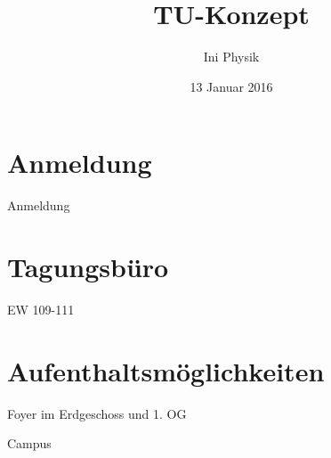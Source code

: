 \documentclass[compress,]{beamer}
\title[TU-Konzept]{TU-Konzept}
\author{Ini Physik}
\institute[TU Berlin]
\begin{document}
\subject{Konzept an der TU}
\date{13 Januar 2016}

\begin{frame}
\titlepage
\end{frame}


\frame{\tableofcontents}

\section{Anmeldung}
\begin{frame}{Anmeldung}
\end{frame}


\section{Tagungsbüro}
\begin{frame}{EW 109-111}
\end{frame}


\section{Aufenthaltsmöglichkeiten}
\begin{frame}{Foyer im Erdgeschoss und 1. OG}
\end{frame}

\begin{frame}{Campus}
\end{frame}
\end{document}
